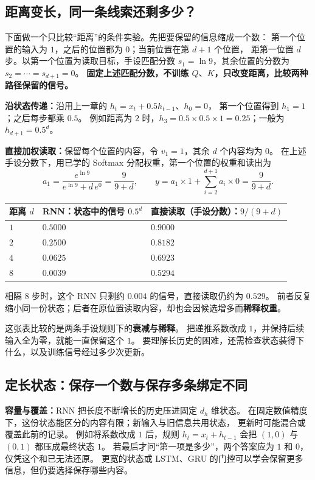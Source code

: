 \subsection{距离变长，同一条线索还剩多少？}
\label{experiment:distance-reading}

下面做一个只比较“距离”的条件实验。先把要保留的信息缩成一个数：
第一个位置的输入为 $1$，之后的位置都为 $0$；当前位置在第 $d+1$ 个位置，
距第一位置 $d$ 步。以第一个位置为读取目标，手设匹配分数
$s_1=\ln9$，其余位置的分数为 $s_2=\cdots=s_{d+1}=0$。
\textbf{固定上述匹配分数，不训练 $Q、K$，只改变距离，比较两种路径保留的信号。}

\textbf{沿状态传递：}沿用上一章的 $h_t=x_t+0.5h_{t-1}$、$h_0=0$，
第一个位置得到 $h_1=1$；之后每步都乘 $0.5$。
例如距离为 $2$ 时，$h_3=0.5\times0.5\times1=0.25$；一般为 $h_{d+1}=0.5^d$。

\textbf{直接加权读取：}保留每个位置的内容，令 $v_1=1$，其余 $d$ 个内容均为 $0$。
在上述手设分数下，用已学的 Softmax 分配权重，第一个位置的权重和读出为
\[
a_1=\frac{e^{\ln9}}{e^{\ln9}+d\,e^0}=\frac{9}{9+d},\qquad
y=a_1\times1+\sum_{i=2}^{d+1}a_i\times0=\frac{9}{9+d}.
\]
\begin{center}\small
\renewcommand{\arraystretch}{1.2}
\begin{tabularx}{\linewidth}{@{}p{24mm}XX@{}}
\toprule
距离 $d$ & RNN：状态中的信号 $0.5^d$ & 直接读取（手设分数）：$9/(9+d)$\\\midrule
$1$ & $0.5000$ & $0.9000$\\
$2$ & $0.2500$ & $0.8182$\\
$4$ & $0.0625$ & $0.6923$\\
$8$ & $0.0039$ & $0.5294$\\
\bottomrule
\end{tabularx}
\end{center}
相隔 $8$ 步时，这个 RNN 只剩约 $0.004$ 的信号，直接读取仍约为 $0.529$。
前者反复缩小同一份状态；后者在原位置读取内容，却也会因候选增多而\textbf{稀释权重}。

这张表比较的是两条手设规则下的\textbf{衰减与稀释}。
把递推系数改成 $1$，并保持后续输入全为零，就能一直保留这个 $1$。
要理解长历史的困难，还需检查状态装得下什么，以及训练信号经过多少次更新。

\subsection{定长状态：保存一个数与保存多条绑定不同}

\textbf{容量与覆盖：}RNN 把长度不断增长的历史压进固定 $d_h$ 维状态。
在固定数值精度下，这份状态能区分的内容有限；新输入与旧信息共用状态，
更新时可能混合或覆盖此前的记录。
例如将系数改成 $1$ 后，规则 $h_t=x_t+h_{t-1}$
会把 $(1,0)$ 与 $(0,1)$ 都压成最终状态 $1$。
若最后才问“第一项是多少”，两个答案应为 $1$ 和 $0$，仅凭这个和已无法还原。
更宽的状态或 LSTM、GRU 的门控可以学会保留更多信息，但仍要选择保存哪些内容。

